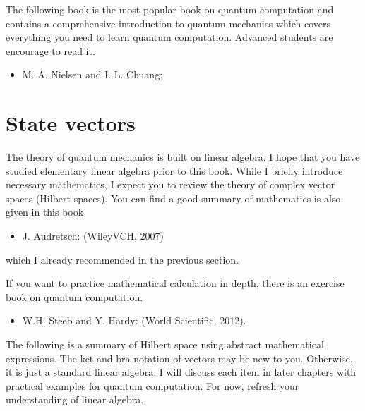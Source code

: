 \documentclass[letterpaper,10pt,english]{jupyterBook}
\begin{document}
\sphinxAtStartPar
The following book is the most popular book on quantum computation and contains a comprehensive introduction to quantum mechanics which covers everything you need to learn quantum computation. Advanced students are encourage to read it.
\begin{itemize}
\item {}
\sphinxAtStartPar
M. A. Nielsen and I. L. Chuang: 

\end{itemize}

\sphinxstepscope


\section{State vectors}
\label{\detokenize{qmsummary/vectors:state-vectors}}\label{\detokenize{qmsummary/vectors:sec-statevectors}}\label{\detokenize{qmsummary/vectors::doc}}
\sphinxAtStartPar
The theory of quantum mechanics is built on linear algebra.  I hope that you have studied elementary linear algebra prior to this book.  While I briefly introduce necessary mathematics, I expect you to review the theory of complex vector spaces (Hilbert spaces).  You can find a good summary of mathematics is also given in this book
\begin{itemize}
\item {}
\sphinxAtStartPar
J. Audretsch:  (Wiley\sphinxhyphen{}VCH, 2007)

\end{itemize}

\sphinxAtStartPar
which I already recommended in the previous section.

\sphinxAtStartPar
If you want to practice mathematical calculation in depth, there is an exercise book on quantum computation.
\begin{itemize}
\item {}
\sphinxAtStartPar
W.\sphinxhyphen{}H. Steeb and Y. Hardy:  (World Scientific, 2012).

\end{itemize}

\sphinxAtStartPar
The following is a summary of Hilbert space using abstract mathematical expressions.  The ket and bra notation of vectors may be new to you.  Otherwise, it is just a standard linear algebra.  I will discuss each item in later chapters with practical examples for quantum computation.  For now, refresh your understanding of linear algebra.
\end{document}
